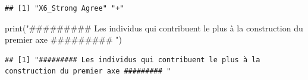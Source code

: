 \documentclass[
]{article}
\newenvironment{Shaded}{\begin{snugshade}}{\end{snugshade}}
\newcommand{\AttributeTok}[1]{\textcolor[rgb]{0.77,0.63,0.00}{#1}}
\newcommand{\ControlFlowTok}[1]{\textcolor[rgb]{0.13,0.29,0.53}{\textbf{#1}}}
\newcommand{\DecValTok}[1]{\textcolor[rgb]{0.00,0.00,0.81}{#1}}
\newcommand{\FunctionTok}[1]{\textcolor[rgb]{0.00,0.00,0.00}{#1}}
\newcommand{\NormalTok}[1]{#1}
\newcommand{\OtherTok}[1]{\textcolor[rgb]{0.56,0.35,0.01}{#1}}
\newcommand{\SpecialCharTok}[1]{\textcolor[rgb]{0.00,0.00,0.00}{#1}}
\newcommand{\StringTok}[1]{\textcolor[rgb]{0.31,0.60,0.02}{#1}}
\begin{document}
\begin{Shaded}
\end{Shaded}

\begin{verbatim}
## [1] "X6_Strong Agree" "+"
\end{verbatim}

\begin{Shaded}
\begin{Highlighting}[]
\FunctionTok{print}\NormalTok{(}\StringTok{"\#\#\#\#\#\#\#\#\# Les individus qui contribuent le plus à la construction du premier axe \#\#\#\#\#\#\#\#\# "}\NormalTok{)}
\end{Highlighting}
\end{Shaded}

\begin{verbatim}
## [1] "######### Les individus qui contribuent le plus à la construction du premier axe ######### "
\end{verbatim}
\end{document}
